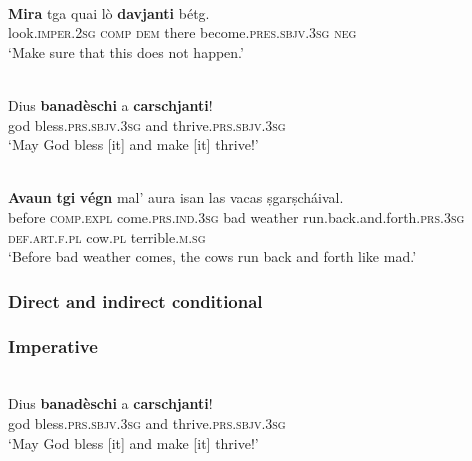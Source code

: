 \ea\label{}
\langinfo{}{}{\DRG{}{}}\\%
\gll  \textbf{Mira} tga quai lò \textbf{davjanti} bétg. \\
     look.\textsc{imper.2sg} \textsc{comp} \textsc{dem} there become.\textsc{pres.sbjv.3sg} \textsc{neg}\\
\glt `Make sure that this does not happen.'
\z

\ea\label{}
\\
\gll Dius \textbf{banadèschi} a \textbf{carschjanti}!\\
     god bless.\textsc{prs.sbjv.3sg} and thrive.\textsc{prs.sbjv.3sg}\\
\glt `May God bless [it] and make [it] thrive!'
\z

\ea\label{}
\\
\gll   \textbf{Avaun} \textbf{tgi} \textbf{végn} mal’ aura isan las vacas ṣgarṣcháival.\\
    before \textsc{comp.expl} come.\textsc{prs.ind.3sg} bad weather run.back.and.forth.\textsc{prs.3sg} \textsc{def.art.f.pl} cow.\textsc{pl} terrible.\textsc{m.sg} \\
\glt `Before bad weather comes, the cows run back and forth like mad.'
\z


\subsubsection{Direct and indirect conditional}







\subsubsection{Imperative}


\ea\label{}
\\
\gll Dius \textbf{banadèschi} a \textbf{carschjanti}!\\
     god bless.\textsc{prs.sbjv.3sg} and thrive.\textsc{prs.sbjv.3sg}\\
\glt `May God bless [it] and make [it] thrive!'
\z


\subsubsection{}



